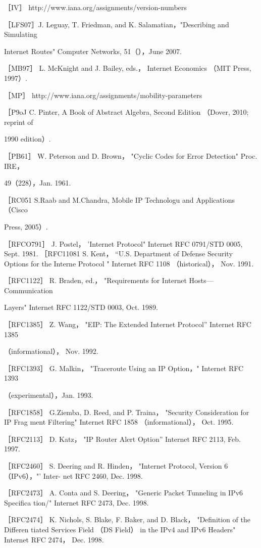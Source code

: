 ［IV］ http://www.iana.org/assignments/version-numbers

［LFS07］J. Leguay, T. Friedman, and K. Salamatian，"Describing and Simulating

Internet Routes" Computer Networks, 51（），June 2007.

［MB97］ L. McKnight and J. Bailey, eds.， Internet Economics （MIT Press, 1997）.

［MP］ http://www.iana.org/assignments/mobility-parameters

［P9oJ C. Pinter, A Book of Abstract Algebra, Second Edition （Dover, 2010; reprint of

1990 edition）.

［PB61］ W. Peterson and D. Brown， "Cyclic Codes for Error Detection" Proc. IRE，

49（228），Jan. 1961.

［RC051 S.Raab and M.Chandra, Mobile IP Technologu and Applications （Cisco

Press, 2005）.

［RFCO791］ J. Postel， 'Internet Protocol" Internet RFC 0791/STD 0005, Sept. 1981.
［RFC11081 S. Kent， “U.S. Department of Defense Security Options for the Interne
Protocol " Internet RFC 1108 （historical）， Nov. 1991.

［RFC1122］ R. Braden, ed.， "Requirements for Internet Hosts—Communication

Layers" Internet RFC 1122/STD 0003, Oct. 1989.

［RFC1385］ Z. Wang， "EIP: The Extended Internet Protocol” Internet RFC 1385

（informational）， Nov. 1992.

［RFC1393］ G. Malkin， "Traceroute Using an IP Option，" Internet RFC 1393

（experimental），Jan. 1993.

［RFC1858］ G.Ziemba, D. Reed, and P. Traina， "Security Consideration for IP Frag
ment Filtering" Internet RFC 1858 （informational）， Oct. 1995.

［RFC2113］ D. Katz， "IP Router Alert Option” Internet RFC 2113, Feb. 1997.

［RFC2460］ S. Deering and R. Hinden， "Internet Protocol, Version 6 （IPv6），"' Inter-
net RFC 2460, Dec. 1998.

［RFC2473］ A. Conta and S. Deering， "Generic Packet Tunneling in IPv6 Specifica
tion/" Internet RFC 2473, Dec. 1998.

［RFC2474］ K. Nichols, S. Blake, F. Baker, and D. Black， "Definition of the Differen
tiated Services Field （DS Field） in the IPv4 and IPv6 Headers" Internet RFC 2474，
Dec. 1998.

